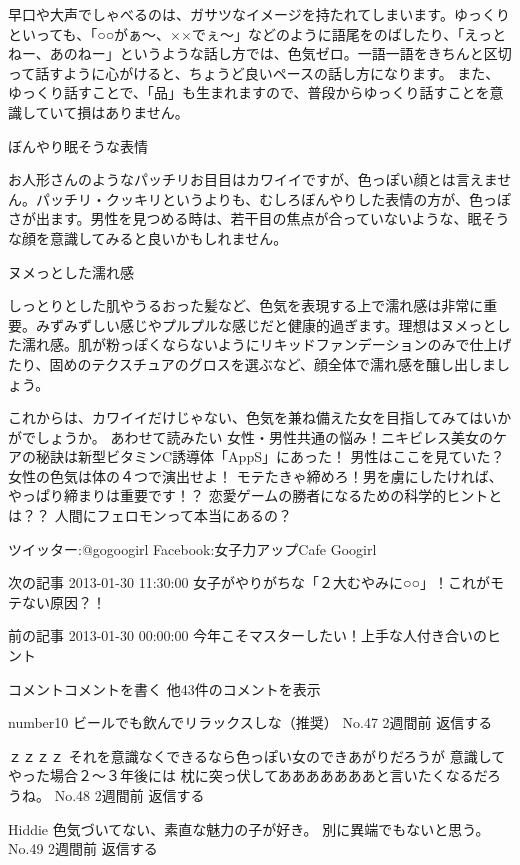 早口や大声でしゃべるのは、ガサツなイメージを持たれてしまいます。ゆっくりといっても、「○○がぁ～、××でぇ～」などのように語尾をのばしたり、「えっとねー、あのねー」というような話し方では、色気ゼロ。一語一語をきちんと区切って話すように心がけると、ちょうど良いペースの話し方になります。
また、ゆっくり話すことで、「品」も生まれますので、普段からゆっくり話すことを意識していて損はありません。


ぼんやり眠そうな表情

お人形さんのようなパッチリお目目はカワイイですが、色っぽい顔とは言えません。パッチリ・クッキリというよりも、むしろぼんやりした表情の方が、色っぽさが出ます。男性を見つめる時は、若干目の焦点が合っていないような、眠そうな顔を意識してみると良いかもしれません。


ヌメっとした濡れ感

しっとりとした肌やうるおった髪など、色気を表現する上で濡れ感は非常に重要。みずみずしい感じやプルプルな感じだと健康的過ぎます。理想はヌメっとした濡れ感。肌が粉っぽくならないようにリキッドファンデーションのみで仕上げたり、固めのテクスチュアのグロスを選ぶなど、顔全体で濡れ感を醸し出しましょう。


これからは、カワイイだけじゃない、色気を兼ね備えた女を目指してみてはいかがでしょうか。
あわせて読みたい
女性・男性共通の悩み！ニキビレス美女のケアの秘訣は新型ビタミンC誘導体「AppS」にあった！
男性はここを見ていた？女性の色気は体の４つで演出せよ！
モテたきゃ締めろ！男を虜にしたければ、やっぱり締まりは重要です！？
恋愛ゲームの勝者になるための科学的ヒントとは？？
人間にフェロモンって本当にあるの？

ツイッター:@gogoogirl 
Facebook:女子力アップCafe Googirl 


 
 

次の記事
2013-01-30 11:30:00
女子がやりがちな「２大むやみに○○」！これがモテない原因？！

前の記事
2013-01-30 00:00:00
今年こそマスターしたい！上手な人付き合いのヒント

コメントコメントを書く
他43件のコメントを表示
 
number10 
ビールでも飲んでリラックスしな（推奨） 
No.47
2週間前
返信する
 
ｚｚｚｚ 
それを意識なくできるなら色っぽい女のできあがりだろうが
意識してやった場合２～３年後には
枕に突っ伏してあああああああと言いたくなるだろうね。 
No.48
2週間前
返信する
 
Hiddie 
色気づいてない、素直な魅力の子が好き。
別に異端でもないと思う。 
No.49
2週間前
返信する
 
